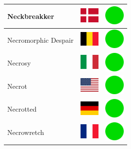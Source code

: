 \documentclass[12pt, a4paper, twoside]{report}
\begin{document}
\begin{center}
\begin{longtable}{|p{5cm}|p{2cm}|p{2cm}|}
 Neckbreakker                                               & \includegraphics[width=1cm]{../img/flags/dk} &   \includegraphics[width=1cm]{../likes/y} \\ \hline
 Necromorphic Despair                                       & \includegraphics[width=1cm]{../img/flags/be} &   \includegraphics[width=1cm]{../likes/y} \\ \hline
 Necrosy                                                    & \includegraphics[width=1cm]{../img/flags/it} &   \includegraphics[width=1cm]{../likes/y} \\ \hline
 Necrot                                                     & \includegraphics[width=1cm]{../img/flags/us} &   \includegraphics[width=1cm]{../likes/y} \\ \hline
 Necrotted                                                  & \includegraphics[width=1cm]{../img/flags/de} &   \includegraphics[width=1cm]{../likes/y} \\ \hline
 Necrowretch                                                & \includegraphics[width=1cm]{../img/flags/fr} &   \includegraphics[width=1cm]{../likes/y} \\ \hline

\end{longtable}
\end{center}
\end{document}
